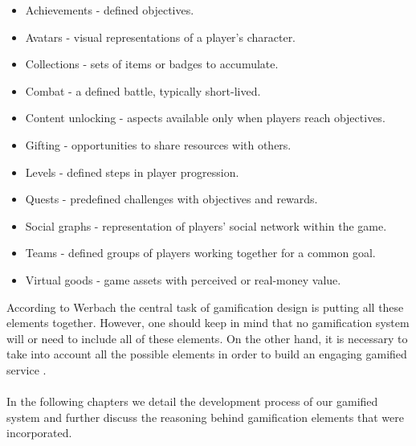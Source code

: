 \begin{itemize}
\item Achievements - defined objectives.
\item Avatars - visual representations of a player's character.
\item Collections - sets of items or badges to accumulate.
\item Combat - a defined battle, typically short-lived.
\item Content unlocking - aspects available only when players reach objectives.
\item Gifting - opportunities to share resources with others.
\item Levels - defined steps in player progression.
\item Quests - predefined challenges with objectives and rewards.
\item Social graphs - representation of players' social network within the game.
\item Teams - defined groups of players working together for a common goal.
\item Virtual goods - game assets with perceived or real-money value.
\end{itemize}
According to Werbach the central task of gamification design is putting all these elements together. However, one should keep in mind that no gamification system will or need to include all of these elements. On the other hand, it is necessary to take into account all the possible elements in order to build an engaging gamified service \cite{werbach2012win}. \\\\
In the following chapters we detail the development process of our gamified system and further discuss the reasoning behind gamification elements that were incorporated. %
